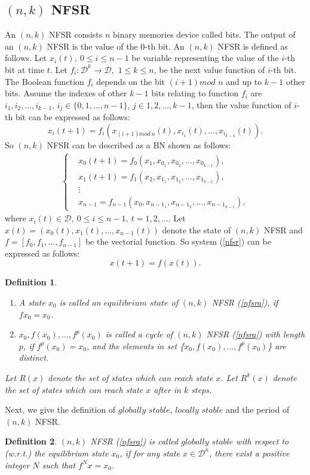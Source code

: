 \documentclass[conference]{IEEEtran}
\newtheorem{definition}{Definition}
\begin{document}
\subsection{$(n,k)$ NFSR}
An $(n,k)$ NFSR consists $n$ binary memories device called bits. The output of an $(n,k)$ NFSR is the value of the $0$-th bit. An $(n,k)$ NFSR is defined as follows. Let $x_i(t),~0\leq i\leq n-1$ be variable representing the value of the $i$-th bit at time $t$. Let $f_i:\mathcal{D}^k\rightarrow \mathcal{D},$ $1\leq k\leq n$, be the next value function of $i$-th bit. The Boolean function $f_i$ depends on the bit $(i+1)mod$ $n$ and up to $k-1$ other bits. Assume the indexes of other $k-1$ bits relating to function $f_i$ are
 $i_1,i_2,...,i_{k-1}$, $i_j\in \{0,1,...,n-1\}$, $j\in{1,2,...,k-1}$, then the value function of $i$-th bit can be expressed as follows:
 \begin{equation}
 x_i(t+1)=f_i(x_{(i+1)mod~n}(t),x_{i_1}(t),...,x_{i_{k-1}}(t)).
 \end{equation}
  So $(n,k)$ NFSR can be described as a BN shown as follows:
 \begin{eqnarray}\label{nfsr}
 \left\{ \begin{aligned}
&x_0(t+1)=f_0(x_1,x_{0_1},x_{0_2},...,x_{0_{k-1}}),\\
&x_1(t+1)=f_1(x_2,x_{1_1},x_{1_2},...,x_{1_{k-1}}),\\
&\vdots\\
&x_{n-1}=f_{n-1}(x_0,x_{n-1_1},x_{n-1_2},...,x_{n-1_{k-1}}),
\end{aligned} \right.
\end{eqnarray}
where $x_i(t)\in \mathcal{D},~0\leq i\leq n-1, ~t=1,2,...$. Let $x(t)=(x_0(t),x_1(t),...,x_{n-1}(t))$ denote the state of $(n,k)$ NFSR and $f=[f_0,f_1,...,f_{n-1}]$ be the vectorial function.
So system (\ref{nfsr}) can be expressed as follows:
\begin{equation}\label{nfsra}
x(t+1)=f(x(t)).
\end{equation}

\begin{definition}
\begin{enumerate}
  \item A state $x_0$ is called an $equilibrium$ $state$ of $(n,k)$ NFSR (\ref{nfsra}), if $fx_0=x_0$.
  \item {$x_0,f(x_0),...,f^p (x_0)$} is called a cycle of $(n,k)$ NFSR (\ref{nfsra}) with length $p$, if $f^p (x_0)=x_0$, and the elements in set \{$x_0,f(x_0),...,f^p (x_0)$\} are distinct.
\end{enumerate}
Let $R(x)$ denote the set of states which can reach state $x$. Let $R^k(x)$ denote the set of states which can reach state $x$ after in $k$ steps.
\end{definition}
Next, we give the definition of $globally$ $stable$, $locally$ $stable$ and the period of $(n,k)$ NFSR.
\begin{definition}
$(n,k)$ NFSR (\ref{nfsra}) is called $globally$ $stable$ with respect to (w.r.t.) the equilibrium state $x_0$, if for any state $x\in \mathcal{D}^n$, there exist a positive integer $N$ such that $f^Nx=x_0$.
\end{definition}
\end{document}

